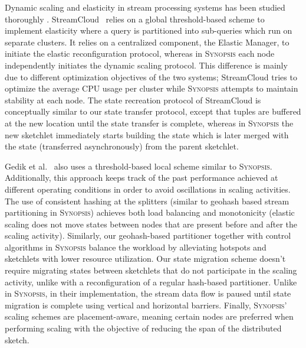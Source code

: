 Dynamic scaling and elasticity in stream processing systems has been studied thoroughly \cite{heinze2014auto, gulisano2012streamcloud, castro2013integrating, loesing2012stormy, heinze2013elastic, schneider2009elastic}.
StreamCloud~\cite{gulisano2012streamcloud} relies on a global threshold-based scheme to implement elasticity where a query is partitioned into sub-queries which run on separate clusters.
It relies on a centralized component, the Elastic Manager, to initiate the elastic reconfiguration protocol, whereas in \textsc{Synopsis} each node independently initiates the dynamic scaling protocol.
This difference is mainly due to different optimization objectives of the two systems; StreamCloud tries to optimize the average CPU usage per cluster while \textsc{Synopsis} attempts to maintain stability at each node.
The state recreation protocol of StreamCloud is conceptually similar to our state transfer protocol, except that tuples are buffered at the new location until the state transfer is complete, whereas in \textsc{Synopsis} the new sketchlet immediately starts building the state which is later merged with the state (transferred asynchronously) from the parent sketchlet.

Gedik et al.~\cite{schneider2009elastic} also uses a threshold-based local scheme similar to \textsc{Synopsis}. Additionally, this approach keeps track of the past performance achieved at different operating conditions in order to avoid oscillations in scaling activities.
The use of consistent hashing at the splitters (similar to geohash based stream partitioning in \textsc{Synopsis}) achieves both load balancing and monotonicity (elastic scaling does not move states between nodes that are present before and after the scaling activity).
Similarly, our geohash-based partitioner together with control algorithms in \textsc{Synopsis} balance the workload by alleviating hotspots and sketchlets with lower resource utilization.
Our state migration scheme doesn't require migrating states between sketchlets that do not participate in the scaling activity, unlike with a reconfiguration of a regular hash-based partitioner.
Unlike in \textsc{Synopsis}, in their implementation, the stream data flow is paused until state migration is complete using vertical and horizontal barriers.
Finally, \textsc{Synopsis}' scaling schemes are placement-aware, meaning certain nodes are preferred when performing scaling with the objective of reducing the span of the distributed sketch.
